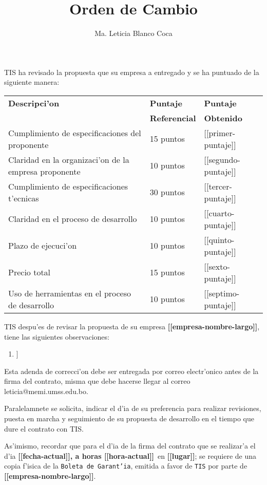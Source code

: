 \documentclass[10pt,letterpaper,twoside]{article}
\newcommand{\empresa}[0]{\textbf{[[empresa-nombre-largo]]}}
\newcommand{\diayhora}[0]{\textbf{[[fecha-actual]], a horas [[hora-actual]]}}
\newcommand{\lugar}[0]{\textbf{[[lugar]]}}
\newcommand{\pp}[0]{[[primer-puntaje]]}
\newcommand{\sep}[0]{[[segundo-puntaje]]}
\newcommand{\tp}[0]{[[tercer-puntaje]]}
\newcommand{\cp}[0]{[[cuarto-puntaje]]}
\newcommand{\qp}[0]{[[quinto-puntaje]]}
\newcommand{\ssp}[0]{[[sexto-puntaje]]}
\newcommand{\sssp}[0]{[[septimo-puntaje]]}
\newcommand{\observacionesDetalle}[1]{\item [[obs-detalle-item]]}
\newcommand{\observaciones}[0]{\observacionesDetalle{[[obs-detalle-item]]}}
\begin{document}
\title{Orden de Cambio}
\author{Ma. Leticia Blanco Coca}
\maketitle


TIS ha revisado la propuesta que su empresa a entregado y se ha puntuado de la siguiente manera:

\begin{tabular}{|l|l|l|}
\hline \textbf{Descripci'on}& \textbf{Puntaje}&\textbf{Puntaje} \\
& \textbf{Referencial}&\textbf{Obtenido} \\
\hline Cumplimiento de especificaciones del proponente       & 15 puntos & \pp \\
\hline Claridad en la organizaci'on de la empresa proponente & 10 puntos & \sep \\
\hline Cumplimiento de especificaciones t'ecnicas            & 30 puntos & \tp \\ 
\hline Claridad en el proceso de desarrollo                  & 10 puntos & \cp \\
\hline Plazo de ejecuci'on                                   & 10 puntos & \qp \\
\hline Precio total                                          & 15 puntos & \ssp \\
\hline Uso de herramientas en el proceso de desarrollo       & 10 puntos & \sssp \\
\hline
\end{tabular}

TIS despu'es de revisar la propuesta de su empresa \empresa, tiene las siguientes observaciones:

\begin{enumerate}
\observaciones
\end{enumerate}

Esta adenda de correcci'on debe ser entregada por correo electr'onico antes de la firma del contrato, misma que debe hacerse llegar al correo leticia@memi.umss.edu.bo.


Paralelamnete se solicita, indicar el d'ia de su preferencia para realizar revisiones, puesta
en marcha  y 
seguimiento de su propuesta de desarrollo en el tiempo que dure el contrato con TIS.


As'imismo, recordar que para el d'ia de la firma del contrato que se realizar'a el d'ia \diayhora\ en \lugar; se requiere de una copia f'isica
 de la 
\texttt{Boleta de Garant'ia}, emitida a favor de \texttt{TIS} por parte de \empresa.
\end{document}
